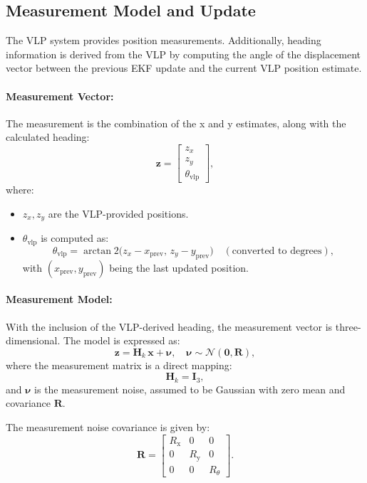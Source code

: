 \subsection*{Measurement Model and Update}

The VLP system provides position measurements. Additionally, heading information is derived from the VLP by computing the angle of the displacement vector between the previous EKF update and the current VLP position estimate.

\paragraph{Measurement Vector:}  
The measurement is the combination of the x and y estimates, along with the calculated heading:
\[
\bm{z} =
\begin{bmatrix}
z_x \\
z_y \\
\theta_{\text{vlp}}
\end{bmatrix},
\]
where:
\begin{itemize}
    \item \(z_x, z_y\) are the VLP-provided positions.
    \item \(\theta_{\text{vlp}}\) is computed as:
    \[
    \theta_{\text{vlp}} = \arctan2\big(z_x - x_{\text{prev}},\, z_y - y_{\text{prev}}\big) \quad (\text{converted to degrees}),
    \]
    with \((x_{\text{prev}}, y_{\text{prev}})\) being the last updated position.
\end{itemize}

\paragraph{Measurement Model:}  
With the inclusion of the VLP-derived heading, the measurement vector is three-dimensional. The model is expressed as:
\[
\bm{z} = \bm{H}_k\, \bm{x} + \bm{\nu}, \quad \bm{\nu} \sim \mathcal{N}(\bm{0}, \bm{R}),
\]
where the measurement matrix is a direct mapping:
\[
\bm{H}_k = \bm{I}_3,
\]
and \(\bm{\nu}\) is the measurement noise, assumed to be Gaussian with zero mean and covariance \(\bm{R}\).

The measurement noise covariance is given by:
\[
\mathbf{R} =
\begin{bmatrix}
R_{\text{x}} & 0 & 0 \\
0 & R_{\text{y}}  & 0 \\
0 & 0 & R_{\theta}
\end{bmatrix}.
\]


